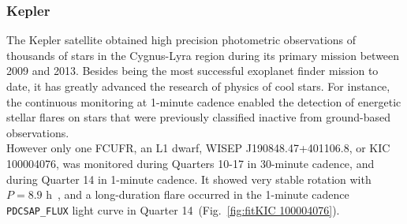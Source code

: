 \documentclass[fleqn,usenatbib,letters]{mnras}%
\newcommand{\FE}{KIC 100004076} %
\begin{document}
\subsubsection{Kepler}
\label{sec:photometryKepler}
The Kepler \citep{koch2010} satellite obtained high precision photometric observations of thousands of stars in the Cygnus-Lyra region during its primary mission between 2009 and 2013. Besides being the most successful exoplanet finder mission to date, it has greatly advanced the research of physics of cool stars. For instance, the continuous monitoring at 1-minute cadence enabled the detection of energetic stellar flares on stars that were previously classified inactive from ground-based observations.
\\
However
only one FCUFR, an L1 dwarf, WISEP J190848.47+401106.8, or \FE, was monitored during Quarters 10-17 in 30-minute cadence, and during Quarter 14 in 1-minute cadence. It showed very stable rotation with $P=8.9$ h~\citep{gizis2013},
and a long-duration flare occurred in the 1-minute cadence \texttt{PDCSAP\_FLUX} light curve in Quarter 14~(Fig.~\ref{fig:fit\FE}).
\end{document}
